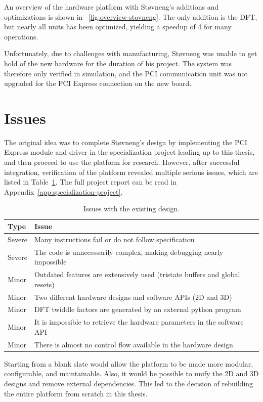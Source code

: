 An overview of the hardware platform with Støvneng's additions and optimizations is shown in \figurename~\ref{fig:overview-stovneng}.
The only addition is the DFT, but nearly all units has been optimized, yielding a speedup of 4 for many operations.

Unfortunately, due to challenges with manufacturing, Støvneng was unable to get hold of the new hardware for the duration of his project.
The system was therefore only verified in simulation, and the PCI communication unit was not upgraded for the PCI Express connection on the new board.


\section{Issues}

The original idea was to complete Støvneng's design by implementing the PCI Express module and driver in the specialization project leading up to this thesis, and then proceed to use the platform for research.
However, after successful integration, verification of the platform revealed multiple serious issues, which are listed in Table~\ref{tab:issues}.
The full project report can be read in Appendix~\ref{app:specialization-project}.

\begin{table}[!ht]
    \renewcommand{\arraystretch}{1.3}
    \centering
    \begin{tabular}{l|l}
        \bfseries Type & \bfseries Issue \\
        \hline
        Severe & Many instructions fail or do not follow specification \\
        Severe & The code is unnecessarily complex, making debugging nearly impossible \\
        Minor & Outdated features are extensively used (tristate buffers and global resets) \\
        Minor & Two different hardware designs and software APIs (2D and 3D) \\
        Minor & DFT twiddle factors are generated by an external python program \\
        Minor & It is impossible to retrieve the hardware parameters in the software API \\
        Minor & There is almost no control flow available in the hardware design \\
    \end{tabular}
    \caption[Issues]{Issues with the existing design.}
    \label{tab:issues}
\end{table}

Starting from a blank slate would allow the platform to be made more modular, configurable, and maintainable.
Also, it would be possible to unify the 2D and 3D designs and remove external dependencies.
This led to the decision of rebuilding the entire platform from scratch in this thesis.
